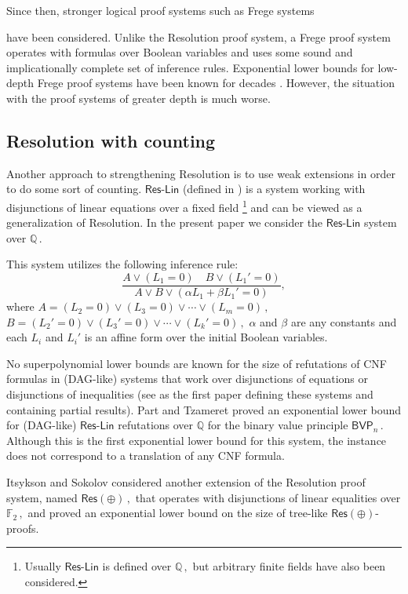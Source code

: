 \documentclass[11pt]{article}
\newcommand{\Q}{{\mathbb Q}}
\begin{document}
Since then, stronger logical proof systems such as Frege systems
%
%
%

%
have been  %
considered. Unlike
the  %
%
Resolution %
proof system, a Frege proof system operates with formulas over Boolean variables and uses some sound and implicationally complete set of inference rules. Exponential lower bounds for low-depth 
Frege proof systems %
have been  %
known for decades \cite{Ajt88, doi:10.1137/0221068,Has20}. However, the situation with the
%
%
%
%
proof systems of greater depth is much worse.
%


%
\subsection{Resolution with counting} %
Another approach to %
strengthening  %
%
Resolution %
is to use weak extensions in order to do some sort of counting. 
$\mathsf{Res}$-$\mathsf{Lin}$ (defined in \cite{RT07}) is a system working with disjunctions of
linear equations over a fixed field \footnote{Usually
$\mathsf{Res}$-$\mathsf{Lin}$ is defined %
%
%
over %
$\mathbb{Q}\,,$ %
 but %
%
%
arbitrary finite fields have also been considered.}  %
%
%
and can be viewed as a generalization of Resolution.  %
%
%
In the present paper we consider the $\mathsf{Res}$-$\mathsf{Lin}$ system over %
$\Q\,.$ %
%
%
%

%
This system   %
utilizes the following inference rule:
$$
 \frac{A \vee (L_1 = 0) \quad B \vee (L_1' = 0)}{A \vee B \vee (\alpha L_1 + \beta L_1' = 0)},  
$$
 where %
$A = (L_2 = 0) \vee (L_3 = 0) \vee \cdots \vee (L_m = 0)\,,$ %
$B = (L_2' = 0) \vee (L_3' = 0) \vee \cdots \vee (L_k' = 0)\,,$ %
 $\alpha$ and $\beta$ are
%
any  %
%
constants and each $L_i$ and $L_i'$ is %
%
an %
affine form over the initial Boolean variables.

%
%
%
%
%
No superpolynomial 
%
%
%
%
lower bounds are known for the size of refutations of %
CNF formulas  %
in (DAG-like) systems that
work over disjunctions of equations or  %
%
%
%
%
disjunctions of %
inequalities (see \cite{Kra98-Discretely} as the first paper defining these systems and containing partial results).  Part and Tzameret \cite{PT18_new} proved an exponential lower bound for (DAG-like) $\mathsf{Res}$-$\mathsf{Lin}$ refutations over $\Q$ for the  binary value principle %
$\mathsf{BVP}_n\,.$ %
 Although this is the first exponential lower bound for this system, the instance does not correspond to a translation of
%
any CNF formula.  %

Itsykson and Sokolov \cite{ITSYKSON2020102722} considered another extension of the
%
Resolution  %
proof system, %
%
named %
$\mathsf{Res}(\oplus)\,,$ %
that operates with disjunctions of linear equalities over %
$\mathbb{F}_2\,,$ %
%
 and proved an exponential lower bound on the size of tree-like $\mathsf{Res}(\oplus)$-proofs.
\end{document}
